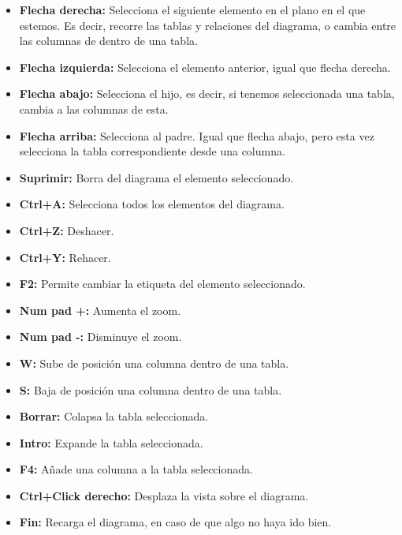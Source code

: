 \begin{itemize}
    \item \textbf{Flecha derecha: }Selecciona el siguiente elemento en el plano en el que estemos. Es decir, recorre las tablas y relaciones del diagrama, o cambia entre las columnas de dentro de una tabla.
    \item \textbf{Flecha izquierda: }Selecciona el elemento anterior, igual que flecha derecha.
    \item \textbf{Flecha abajo: }Selecciona el hijo, es decir, si tenemos seleccionada una tabla, cambia a las columnas de esta.
    \item \textbf{Flecha arriba: }Selecciona al padre. Igual que flecha abajo, pero esta vez selecciona la tabla correspondiente desde una columna.
    \item \textbf{Suprimir: }Borra del diagrama el elemento seleccionado.
    \item \textbf{Ctrl+A: }Selecciona todos los elementos del diagrama.
    \item \textbf{Ctrl+Z: }Deshacer.
    \item \textbf{Ctrl+Y: }Rehacer.
    \item \textbf{F2: }Permite cambiar la etiqueta del elemento seleccionado.
    \item \textbf{Num pad +: }Aumenta el zoom.
    \item \textbf{Num pad -: }Disminuye el zoom.
    \item \textbf{W: }Sube de posición una columna dentro de una tabla.
    \item \textbf{S: }Baja de posición una columna dentro de una tabla.
    \item \textbf{Borrar: }Colapsa la tabla seleccionada.
    \item \textbf{Intro: }Expande la tabla seleccionada.
    \item \textbf{F4: }Añade una columna a la tabla seleccionada.
    \item \textbf{Ctrl+Click derecho: }Desplaza la vista sobre el diagrama.
    \item \textbf{Fin: }Recarga el diagrama, en caso de que algo no haya ido bien.
\end{itemize}